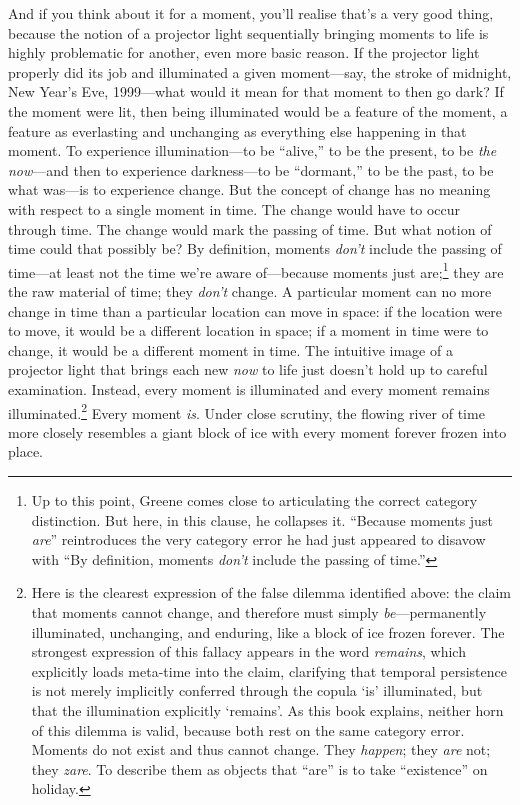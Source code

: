 \documentclass[12pt]{book}
\begin{document}
And if you think about it for a moment, you'll realise that's a very good thing, because the notion of a projector light sequentially bringing moments to life is highly problematic for another, even more basic reason. If the projector light properly did its job and illuminated a given moment---say, the stroke of midnight, New Year's Eve, 1999---what would it mean for that moment to then go dark? If the moment were lit, then being illuminated would be a feature of the moment, a feature as everlasting and unchanging as everything else happening in that moment. To experience illumination---to be ``alive,'' to be the present, to be \textit{the now}---and then to experience darkness---to be ``dormant,'' to be the past, to be what was---is to experience change. But the concept of change has no meaning with respect to a single moment in time. The change would have to occur through time. The change would mark the passing of time. But what notion of time could that possibly be? By definition, moments \textit{don't} include the passing of time---at least not the time we're aware of---because moments just are;\footnote{Up to this point, Greene comes close to articulating the correct category distinction. But here, in this clause, he collapses it. ``Because moments just \textit{are}'' reintroduces the very category error he had just appeared to disavow with ``By definition, moments \textit{don't} include the passing of time.''} they are the raw material of time; they \textit{don't} change. A particular moment can no more change in time than a particular location can move in space: if the location were to move, it would be a different location in space; if a moment in time were to change, it would be a different moment in time. The intuitive image of a projector light that brings each new \textit{now} to life just doesn't hold up to careful examination. Instead, every moment is illuminated and every moment remains illuminated.\footnote{Here is the clearest expression of the false dilemma identified above: the claim that moments cannot change, and therefore must simply \textit{be}---permanently illuminated, unchanging, and enduring, like a block of ice frozen forever. The strongest expression of this fallacy appears in the word \textit{remains}, which explicitly loads meta-time into the claim, clarifying that temporal persistence is not merely implicitly conferred through the copula `is' illuminated, but that the illumination explicitly `remains'. As this book explains, neither horn of this dilemma is valid, because both rest on the same category error. Moments do not exist and thus cannot change. They \textit{happen}; they \textit{are} not; they \textit{zare}. To describe them as objects that ``are'' is to take ``existence'' on holiday.} Every moment \textit{is}. Under close scrutiny, the flowing river of time more closely resembles a giant block of ice with every moment forever frozen into place.
\end{document}
